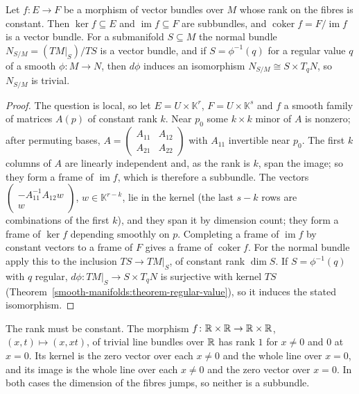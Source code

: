 \begin{proposition}\label{vector-bundles:proposition-constant-rank}
Let $f \colon E \to F$ be a morphism of vector bundles over $M$ whose rank on the fibres is constant. Then $\ker f \subseteq E$ and $\operatorname{im}f \subseteq F$ are subbundles, and $\operatorname{coker}f = F/\operatorname{im}f$ is a vector
bundle. For a submanifold $S \subseteq M$ the normal bundle $N_{S/M} = (TM|_S)/TS$ is a vector bundle, and if $S = \phi^{-1}(q)$ for a regular value $q$ of a smooth $\phi \colon M \to N$, then $d\phi$ induces an isomorphism
$N_{S/M} \cong S \times T_qN$, so $N_{S/M}$ is trivial.
\end{proposition}

\begin{proof}
The question is local, so let $E = U \times \mathbb{K}^r$, $F = U \times \mathbb{K}^s$ and $f$ a smooth family of matrices $A(p)$ of constant rank $k$. Near $p_0$ some $k \times k$ minor of $A$ is nonzero; after permuting bases,
$A = \begin{pmatrix}A_{11} & A_{12}\\ A_{21} & A_{22}\end{pmatrix}$ with $A_{11}$ invertible near $p_0$. The first $k$ columns of $A$ are linearly independent and, as the rank is $k$, span the image; so they form a frame of $\operatorname{im}f$,
which is therefore a subbundle. The vectors $\begin{pmatrix}-A_{11}^{-1}A_{12}w\\ w\end{pmatrix}$, $w \in \mathbb{K}^{r-k}$, lie in the kernel (the last $s - k$ rows are combinations of the first $k$), and they span it by dimension count; they
form a frame of $\ker f$ depending smoothly on $p$. Completing a frame of $\operatorname{im}f$ by constant vectors to a frame of $F$ gives a frame of $\operatorname{coker}f$. For the normal bundle apply this to the inclusion
$TS \to TM|_S$, of constant rank $\dim S$. If $S = \phi^{-1}(q)$ with $q$ regular, $d\phi \colon TM|_S \to S \times T_qN$ is surjective with kernel $TS$ (Theorem~\ref{smooth-manifolds:theorem-regular-value}), so it induces the stated isomorphism.
\end{proof}

\begin{counterexample}\label{vector-bundles:counterexample-rank-jump}
The rank must be constant. The morphism $f \colon \mathbb{R} \times \mathbb{R} \to \mathbb{R} \times \mathbb{R}$, $(x, t) \mapsto (x, xt)$, of trivial line bundles over $\mathbb{R}$ has rank $1$ for $x \neq 0$ and $0$ at
$x = 0$. Its kernel is the zero vector over each $x \neq 0$ and the whole line over $x = 0$, and its image is the whole line over each $x \neq 0$ and the zero vector over $x = 0$.
In both cases the dimension of the fibres jumps, so neither is a subbundle.
\end{counterexample}

